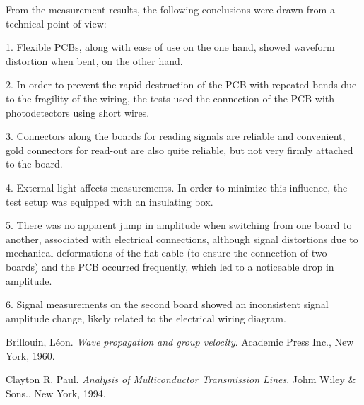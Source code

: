 \documentclass[../BTOF_summary.tex]{subfiles}
\begin{document}
From the measurement results, the following conclusions were drawn from a technical point of view:

1. Flexible PCBs, along with ease of use on the one hand, showed waveform distortion when bent, on the other hand.

2. In order to prevent the rapid destruction of the PCB with repeated bends due to the fragility of the wiring, the tests used the connection of the PCB with photodetectors using short wires.

3. Connectors along the boards for reading signals are reliable and convenient, gold connectors for read-out are also quite reliable, but not very firmly attached to the board.

4. External light affects measurements. In order to minimize this influence, the test setup was equipped with an insulating box.

5. There was no apparent jump in amplitude when switching from one board to another, associated with electrical connections, although signal distortions due to mechanical deformations of the flat cable (to ensure the connection of two boards) and the PCB occurred frequently, which led to a noticeable drop in amplitude.

6. Signal measurements on the second board showed an inconsistent signal amplitude change, likely related to the electrical wiring diagram.

\begin{thebibliography}{9}
Brillouin, Léon. 
\textit{Wave propagation and group velocity}. 
Academic Press Inc., New York, 1960.

Clayton R. Paul. 
\textit{Analysis of Multiconductor Transmission Lines}. 
Johm Wiley \& Sons., New York, 1994.

\end{thebibliography}
\end{document}
